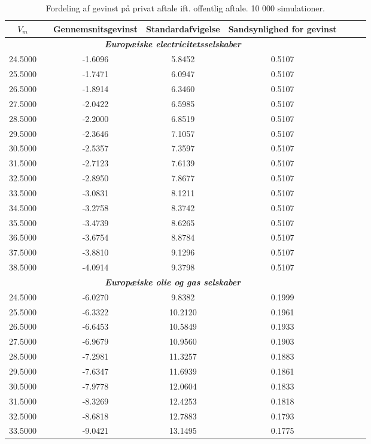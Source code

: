\documentclass{article}
\begin{document}
\begin{table}[h]
	\caption{Fordeling af gevinst p\aa{} privat aftale ift. offentlig aftale. 10 000 simulationer.}
	\label{tab:rel_fordeling}
	\begin{tabularx}{0.95\linewidth}{cXcccccr}
	\toprule[1pt]
	$V_m$ && Gennemsnitsgevinst & Standardafvigelse & Sandsynlighed for gevinst\\
	\hline
\multicolumn{5}{c}{\emph{\textbf{Europæiske electricitetsselskaber}}} \\ 
24.5000&&-1.6096& 5.8452& 0.5107\\
25.5000&&-1.7471& 6.0947& 0.5107\\
26.5000&&-1.8914& 6.3460& 0.5107\\
27.5000&&-2.0422& 6.5985& 0.5107\\
28.5000&&-2.2000& 6.8519& 0.5107\\
29.5000&&-2.3646& 7.1057& 0.5107\\
30.5000&&-2.5357& 7.3597& 0.5107\\
31.5000&&-2.7123& 7.6139& 0.5107\\
32.5000&&-2.8950& 7.8677& 0.5107\\
33.5000&&-3.0831& 8.1211& 0.5107\\
34.5000&&-3.2758& 8.3742& 0.5107\\
35.5000&&-3.4739& 8.6265& 0.5107\\
36.5000&&-3.6754& 8.8784& 0.5107\\
37.5000&&-3.8810& 9.1296& 0.5107\\
38.5000&&-4.0914& 9.3798& 0.5107\\
\multicolumn{5}{c}{\emph{\textbf{Europæiske olie og gas selskaber}}} \\
24.5000&&-6.0270& 9.8382& 0.1999\\
25.5000&&-6.3322&10.2120& 0.1961\\
26.5000&&-6.6453&10.5849& 0.1933\\
27.5000&&-6.9679&10.9560& 0.1903\\
28.5000&&-7.2981&11.3257& 0.1883\\
29.5000&&-7.6347&11.6939& 0.1861\\
30.5000&&-7.9778&12.0604& 0.1833\\
31.5000&&-8.3269&12.4253& 0.1818\\
32.5000&&-8.6818&12.7883& 0.1793\\
33.5000&&-9.0421&13.1495& 0.1775\\

\end{tabularx}
\end{table}
\end{document}
